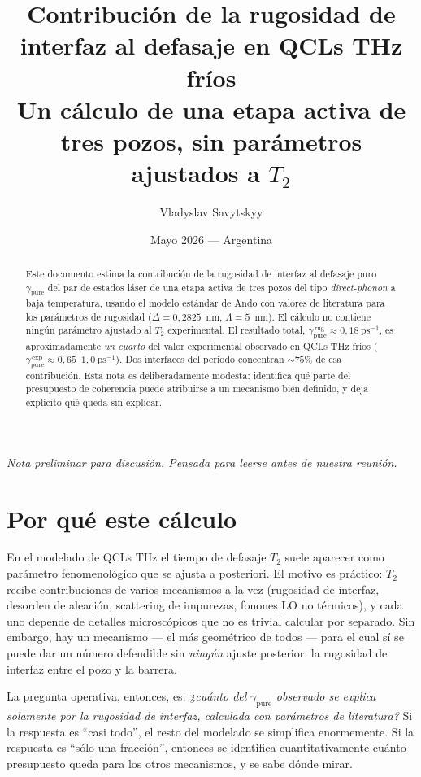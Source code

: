 \documentclass[11pt,a4paper]{article}
\title{\textbf{Contribución de la rugosidad de interfaz al defasaje en QCLs THz fríos}\\[0.3em]
\large Un cálculo de una etapa activa de tres pozos, sin parámetros ajustados a $T_2$}
\author{Vladyslav Savytskyy}
\date{Mayo 2026 \quad --- \quad Argentina}
\begin{document}
\maketitle

\begin{center}
\textit{Nota preliminar para discusión. Pensada para leerse antes de nuestra reunión.}
\end{center}

\vspace{1em}

\begin{abstract}
\noindent Este documento estima la contribución de la rugosidad de interfaz al
defasaje puro $\gamma_{\mathrm{pure}}$ del par de estados láser de una etapa
activa de tres pozos del tipo \emph{direct-phonon} a baja temperatura, usando
el modelo estándar de Ando con valores de literatura para los parámetros de
rugosidad ($\Delta = 0{,}2825$~nm, $\Lambda = 5$~nm). El cálculo no contiene
ningún parámetro ajustado al $T_2$ experimental. El resultado total,
$\gamma_{\mathrm{pure}}^{\,\mathrm{rug}} \approx 0{,}18~\mathrm{ps}^{-1}$,
es aproximadamente \emph{un cuarto} del valor experimental observado en QCLs
THz fríos ($\gamma_{\mathrm{pure}}^{\,\mathrm{exp}} \approx 0{,}65$--$1{,}0~\mathrm{ps}^{-1}$).
Dos interfaces del período concentran $\sim\!75\%$ de esa contribución. Esta
nota es deliberadamente modesta: identifica qué parte del presupuesto de
coherencia puede atribuirse a un mecanismo bien definido, y deja explícito
qué queda sin explicar.
\end{abstract}

\section{Por qué este cálculo}

En el modelado de QCLs THz el tiempo de defasaje $T_2$ suele aparecer como
parámetro fenomenológico que se ajusta a posteriori. El motivo es práctico:
$T_2$ recibe contribuciones de varios mecanismos a la vez (rugosidad de
interfaz, desorden de aleación, scattering de impurezas, fonones LO no
térmicos), y cada uno depende de detalles microscópicos que no es trivial
calcular por separado. Sin embargo, hay un mecanismo --- el más geométrico
de todos --- para el cual sí se puede dar un número defendible sin
\emph{ningún} ajuste posterior: la rugosidad de interfaz entre el pozo y la
barrera.

La pregunta operativa, entonces, es: \emph{¿cuánto del} $\gamma_{\mathrm{pure}}$
\emph{observado se explica solamente por la rugosidad de interfaz, calculada
con parámetros de literatura?} Si la respuesta es ``casi todo'', el resto del
modelado se simplifica enormemente. Si la respuesta es ``sólo una fracción'',
entonces se identifica cuantitativamente cuánto presupuesto queda para los
otros mecanismos, y se sabe dónde mirar.
\end{document}
